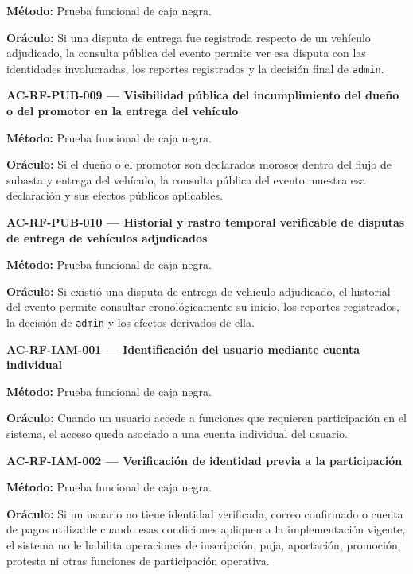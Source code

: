\documentclass[10pt,letterpaper]{article}
\begin{document}
\textbf{Método:} Prueba funcional de caja negra.\par
\textbf{Oráculo:} Si una disputa de entrega fue registrada respecto de un vehículo adjudicado, la consulta pública del evento permite ver esa disputa con las identidades involucradas, los reportes registrados y la decisión final de \texttt{admin}.\par\vspace{0.45em}
\noindent\textbf{AC-RF-PUB-009 --- Visibilidad pública del incumplimiento del dueño o del promotor en la entrega del vehículo}\par
\textbf{Método:} Prueba funcional de caja negra.\par
\textbf{Oráculo:} Si el dueño o el promotor son declarados morosos dentro del flujo de subasta y entrega del vehículo, la consulta pública del evento muestra esa declaración y sus efectos públicos aplicables.\par\vspace{0.45em}
\noindent\textbf{AC-RF-PUB-010 --- Historial y rastro temporal verificable de disputas de entrega de vehículos adjudicados}\par
\textbf{Método:} Prueba funcional de caja negra.\par
\textbf{Oráculo:} Si existió una disputa de entrega de vehículo adjudicado, el historial del evento permite consultar cronológicamente su inicio, los reportes registrados, la decisión de \texttt{admin} y los efectos derivados de ella.\par\vspace{0.45em}
\noindent\textbf{AC-RF-IAM-001 --- Identificación del usuario mediante cuenta individual}\par
\textbf{Método:} Prueba funcional de caja negra.\par
\textbf{Oráculo:} Cuando un usuario accede a funciones que requieren participación en el sistema, el acceso queda asociado a una cuenta individual del usuario.\par\vspace{0.45em}
\noindent\textbf{AC-RF-IAM-002 --- Verificación de identidad previa a la participación}\par
\textbf{Método:} Prueba funcional de caja negra.\par
\textbf{Oráculo:} Si un usuario no tiene identidad verificada, correo confirmado o cuenta de pagos utilizable cuando esas condiciones apliquen a la implementación vigente, el sistema no le habilita operaciones de inscripción, puja, aportación, promoción, protesta ni otras funciones de participación operativa.\par\vspace{0.45em}
\end{document}
